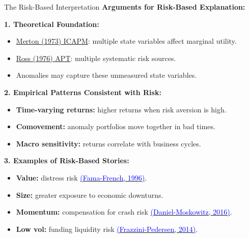 \documentclass{beamer}
\begin{document}
\begin{frame}{The Risk-Based Interpretation}
    \small
    \textbf{Arguments for Risk-Based Explanation:}
    \vspace{2pt}

    \textbf{1. Theoretical Foundation:}
    \begin{itemize}\setlength\itemsep{1pt}
        \item \textcolor{blue}{\href{https://doi.org/10.2307/1913811}{Merton (1973) ICAPM}}: multiple state variables affect marginal utility.
        \item \textcolor{blue}{\href{https://doi.org/10.1016/0022-0531(76)90046-6}{Ross (1976) APT}}: multiple systematic risk sources.
        \item Anomalies may capture these unmeasured state variables.
    \end{itemize}

    \textbf{2. Empirical Patterns Consistent with Risk:}
    \begin{itemize}\setlength\itemsep{1pt}
        \item \textbf{Time-varying returns:} higher returns when risk aversion is high.
        \item \textbf{Comovement:} anomaly portfolios move together in bad times.
        \item \textbf{Macro sensitivity:} returns correlate with business cycles.
    \end{itemize}

    \textbf{3. Examples of Risk-Based Stories:}
    \begin{itemize}\setlength\itemsep{1pt}
        \item \textbf{Value:} distress risk \href{https://doi.org/10.1111/j.1540-6261.1996.tb05202.x}{\textcolor{blue}{(Fama-French, 1996)}}.
        \item \textbf{Size:} greater exposure to economic downturns.
        \item \textbf{Momentum:} compensation for crash risk \href{https://doi.org/10.1016/j.jfineco.2015.12.002}{\textcolor{blue}{(Daniel-Moskowitz, 2016)}}.
        \item \textbf{Low vol:} funding liquidity risk \href{https://doi.org/10.1016/j.jfineco.2013.10.005}{\textcolor{blue}{(Frazzini-Pedersen, 2014)}}.
    \end{itemize}
\end{frame}
\end{document}
